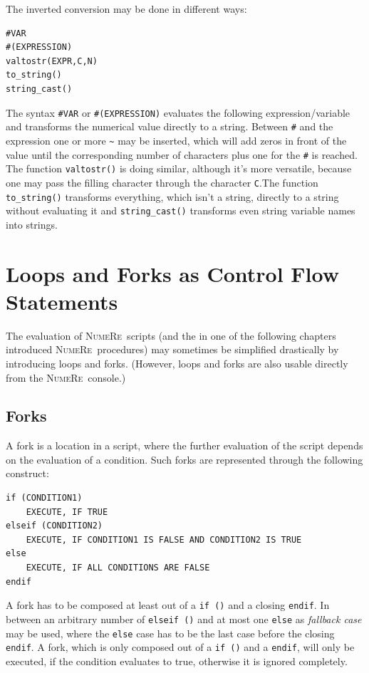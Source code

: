 \documentclass[DIV=14,headsepline,footsepline]{scrbook}
\newcommand{\NR}{\textsc{Nu\-me\-Re}}
\begin{document}
				The inverted conversion may be done in different ways:
				\begin{lstlisting}
#VAR
#(EXPRESSION)
valtostr(EXPR,C,N)
to_string()
string_cast()
				\end{lstlisting}
				The syntax \verb+#VAR+ or \verb+#(EXPRESSION)+ evaluates the following expression/variable and transforms the numerical value directly to a string. Between \verb+#+ and the expression one or more \verb+~+ may be inserted, which will add zeros in front of the value until the corresponding number of characters plus one for the \verb+#+ is reached. The function \verb+valtostr()+ is doing similar, although it's more versatile, because one may pass the filling character through the character \verb+C+.The function \verb+to_string()+ transforms everything, which isn't a string, directly to a string without evaluating it and \verb+string_cast()+ transforms even string variable names into strings.
		\chapter{Loops and Forks as Control Flow Statements}
			The evaluation of \NR\ scripts (and the in one of the following chapters introduced \NR\ procedures) may sometimes be simplified drastically by introducing loops and forks. (However, loops and forks are also usable directly from the \NR\ console.)
			\section{Forks}
				A fork is a location in a script, where the further evaluation of the script depends on the evaluation of a condition. Such forks are represented through the following construct:
				\begin{lstlisting}
if (CONDITION1)
	EXECUTE, IF TRUE
elseif (CONDITION2)
	EXECUTE, IF CONDITION1 IS FALSE AND CONDITION2 IS TRUE
else
	EXECUTE, IF ALL CONDITIONS ARE FALSE
endif
				\end{lstlisting}
				
				A fork has to be composed at least out of a \verb+if ()+ and a closing \verb+endif+. In between an arbitrary number of \verb+elseif ()+ and at most one \verb+else+ as \emph{fallback case} may be used, where the \verb+else+ case has to be the last case before the closing \verb+endif+. A fork, which is only composed out of a \verb+if ()+ and a \verb+endif+, will only be executed, if the condition evaluates to true, otherwise it is ignored completely.
			
\end{document}
